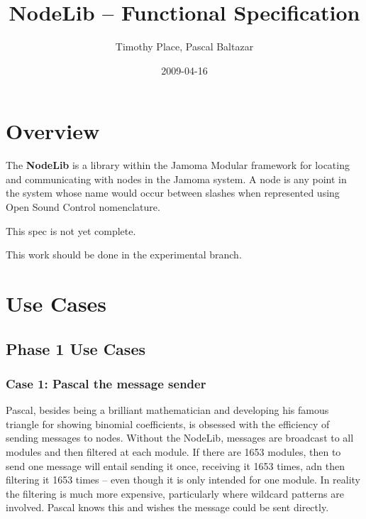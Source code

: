 \documentclass[]{article}
\title{NodeLib -- Functional Specification}
\author{ Timothy Place, Pascal Baltazar }
\date{2009-04-16}
\begin{document}
\ifpdf
{}
\else
{}
\fi

\maketitle


\begin{abstract}
\end{abstract}





\section{Overview}

The \textbf{NodeLib} is a library within the Jamoma Modular framework for locating and communicating with nodes in the Jamoma system.  A node is any point in the system whose name would occur between slashes when represented using Open Sound Control nomenclature.  

This spec is not yet complete.

This work should be done in the experimental branch.



\section{Use Cases}

\subsection{Phase 1 Use Cases}

\subsubsection{Case 1: Pascal the message sender}

Pascal, besides being a brilliant mathematician and developing his famous triangle for showing binomial coefficients, is obsessed with the efficiency of sending messages to nodes.  Without the NodeLib, messages are broadcast to all modules and then filtered at each module.  If there are 1653 modules, then to send one message will entail sending it once, receiving it 1653 times, adn then filtering it 1653 times -- even though it is only intended for one module.  In reality the filtering is much more expensive, particularly where wildcard patterns are involved.  Pascal knows this and wishes the message could be sent directly.
\end{document}

